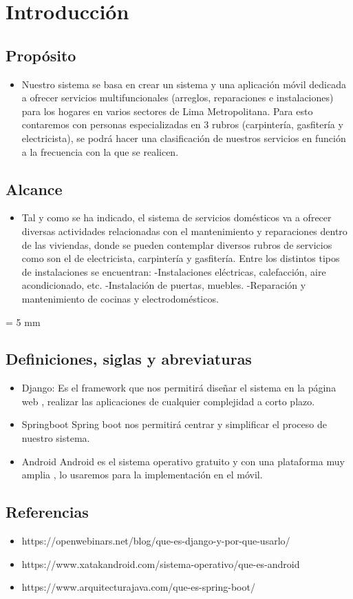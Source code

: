 \chapter{Introducción}

\section{Propósito}
\begin{itemize}
	\item Nuestro sistema se basa en crear un sistema y una aplicación móvil dedicada a ofrecer servicios multifuncionales (arreglos, reparaciones e instalaciones) para los hogares en varios sectores de Lima Metropolitana. Para esto contaremos con personas especializadas en 3 rubros (carpintería, gasfitería y electricista), se podrá hacer una clasificación de nuestros servicios en función a la frecuencia con la que se realicen.
\end{itemize}
\section{Alcance}
\begin{itemize}
	\item Tal y como se ha indicado, el sistema de servicios domésticos va a ofrecer diversas actividades relacionadas con el mantenimiento y reparaciones dentro de las viviendas, donde se pueden contemplar diversos rubros de servicios como son el de electricista, carpintería y gasfitería.
	Entre los distintos tipos de instalaciones se encuentran:
	-Instalaciones eléctricas, calefacción, aire acondicionado, etc.
	-Instalación de puertas, muebles.
	-Reparación y mantenimiento de cocinas y electrodomésticos.
\end{itemize}
\parskip = 5 mm
\section{Definiciones, siglas y abreviaturas}
\begin{itemize}
	\item Django:
	Es el framework que nos permitirá diseñar el sistema en la página web , realizar las aplicaciones de cualquier complejidad a corto plazo.
	\item Springboot
	Spring boot nos permitirá centrar y simplificar el proceso de nuestro sistema.
	\item Android
	Android es el sistema operativo gratuito y con una plataforma muy amplia , lo usaremos para la implementación en el móvil.
\end{itemize}
\section{Referencias}
\begin{itemize}
	\item https://openwebinars.net/blog/que-es-django-y-por-que-usarlo/ 
	\item
	https://www.xatakandroid.com/sistema-operativo/que-es-android 
	\item https://www.arquitecturajava.com/que-es-spring-boot/
\end{itemize}

